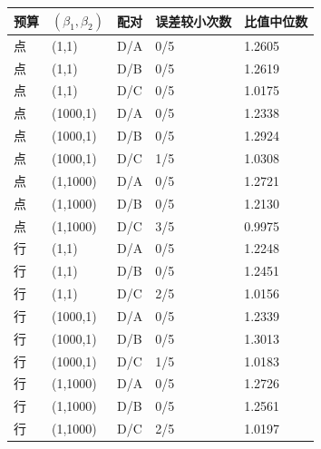 \begin{tabular}{lllll}\toprule
预算 & $(\beta_1,\beta_2)$ & 配对 & 误差较小次数 & 比值中位数 \\ \midrule
点 & (1,1) & D/A & 0/5 & 1.2605 \\
点 & (1,1) & D/B & 0/5 & 1.2619 \\
点 & (1,1) & D/C & 0/5 & 1.0175 \\
点 & (1000,1) & D/A & 0/5 & 1.2338 \\
点 & (1000,1) & D/B & 0/5 & 1.2924 \\
点 & (1000,1) & D/C & 1/5 & 1.0308 \\
点 & (1,1000) & D/A & 0/5 & 1.2721 \\
点 & (1,1000) & D/B & 0/5 & 1.2130 \\
点 & (1,1000) & D/C & 3/5 & 0.9975 \\
行 & (1,1) & D/A & 0/5 & 1.2248 \\
行 & (1,1) & D/B & 0/5 & 1.2451 \\
行 & (1,1) & D/C & 2/5 & 1.0156 \\
行 & (1000,1) & D/A & 0/5 & 1.2339 \\
行 & (1000,1) & D/B & 0/5 & 1.3013 \\
行 & (1000,1) & D/C & 1/5 & 1.0183 \\
行 & (1,1000) & D/A & 0/5 & 1.2726 \\
行 & (1,1000) & D/B & 0/5 & 1.2561 \\
行 & (1,1000) & D/C & 2/5 & 1.0197 \\
\bottomrule\end{tabular}
